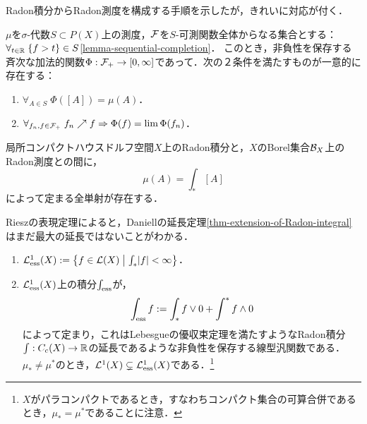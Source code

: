 \documentclass[uplatex,dvipdfmx]{jsreport}
\begin{document}
\begin{tcolorbox}[colframe=ForestGreen, colback=ForestGreen!10!white,breakable,colbacktitle=ForestGreen!40!white,coltitle=black,fonttitle=\bfseries\sffamily,
title=]
    Radon積分からRadon測度を構成する手順を示したが，きれいに対応が付く．
\end{tcolorbox}

\begin{lemma}
    $\mu$を$\sigma$-代数$S\subset P(X)$上の測度，$\mathcal{F}$を$S$-可測関数全体からなる集合とする：$\forall_{t\in\mathbb{R}}\;\{f>t\}\in S$\ref{lemma-sequential-completion}．
    このとき，非負性を保存する斉次な加法的関数$\Phi:\mathcal{F}_+\to[0,\infty]$であって．次の２条件を満たすものが一意的に存在する：
    \begin{enumerate}
        \item $\forall_{A\in S}\;\Phi([A])=\mu(A)$．
        \item $\forall_{f_n,f\in\mathcal{F}_+}\;f_n\nearrow f\Rightarrow\Phi(f)=\lim\Phi(f_n)$．
    \end{enumerate}
\end{lemma}

\begin{theorem}\label{thm-Riesz-representation}
    局所コンパクトハウスドルフ空間$X$上のRadon積分と，$X$のBorel集合$\mathcal{B}_X$上のRadon測度との間に，
    \[\mu(A)=\int_*[A]\]
    によって定まる全単射が存在する．
\end{theorem}

\begin{remark}
    Rieszの表現定理によると，Daniellの延長定理\ref{thm-extension-of-Radon-integral}はまだ最大の延長ではないことがわかる．
\end{remark}

\begin{definition}\mbox{}
    \begin{enumerate}
        \item $\mathcal{L}^1_{\mathrm{ess}}(X):=\left\{f\in\mathcal{L}(X)\;\middle|\;\int_*\lvert f\rvert<\infty\right\}$．
        \item $\mathcal{L}^1_{\mathrm{ess}}(X)$上の積分$\int_{\mathrm{ess}}$が，
        \[\int_{\mathrm{ess}} f:=\int_*f\lor 0+\int^*f\land 0\]
        によって定まり，これはLebesgueの優収束定理を満たすようなRadon積分$\int:C_c(X)\to\mathbb{R}$の延長であるような非負性を保存する線型汎関数である．
        $\mu_*\ne\mu^*$のとき，$\mathcal{L}^1(X)\subsetneq\mathcal{L}^1_{\mathrm{ess}}(X)$である．\footnote{$X$がパラコンパクトであるとき，すなわちコンパクト集合の可算合併であるとき，$\mu_*=\mu^*$であることに注意．}
    \end{enumerate}
\end{definition}
\end{document}
